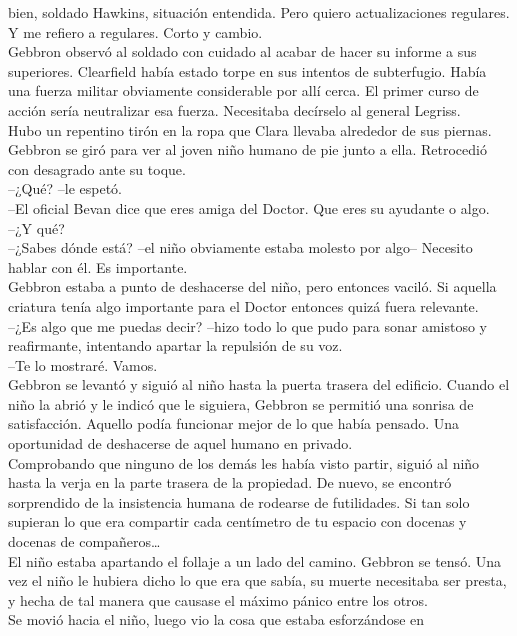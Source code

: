 bien, soldado Hawkins, situación entendida. Pero quiero actualizaciones
regulares. Y me refiero a regulares. Corto y cambio.\\
Gebbron observó al soldado con cuidado al acabar de hacer su informe a
sus superiores. Clearfield había estado torpe en sus intentos de
subterfugio. Había una fuerza militar obviamente considerable por allí
cerca. El primer curso de acción sería neutralizar esa fuerza.
Necesitaba decírselo al general Legriss.\\
Hubo un repentino tirón en la ropa que Clara llevaba alrededor de sus
piernas. Gebbron se giró para ver al joven niño humano de pie junto a
ella. Retrocedió con desagrado ante su toque.\\
--¿Qué? --le espetó.\\
--El oficial Bevan dice que eres amiga del Doctor. Que eres su ayudante
o algo.\\
--¿Y qué?\\
--¿Sabes dónde está? --el niño obviamente estaba molesto por algo--
Necesito hablar con él. Es importante.\\
Gebbron estaba a punto de deshacerse del niño, pero entonces vaciló. Si
aquella criatura tenía algo importante para el Doctor entonces quizá
fuera relevante.\\
--¿Es algo que me puedas decir? --hizo todo lo que pudo para sonar
amistoso y reafirmante, intentando apartar la repulsión de su voz.\\
--Te lo mostraré. Vamos.\\
Gebbron se levantó y siguió al niño hasta la puerta trasera del
edificio. Cuando el niño la abrió y le indicó que le siguiera, Gebbron
se permitió una sonrisa de satisfacción. Aquello podía funcionar mejor
de lo que había pensado. Una oportunidad de deshacerse de aquel humano
en privado.\\
Comprobando que ninguno de los demás les había visto partir, siguió al
niño hasta la verja en la parte trasera de la propiedad. De nuevo, se
encontró sorprendido de la insistencia humana de rodearse de
futilidades. Si tan solo supieran lo que era compartir cada centímetro
de tu espacio con docenas y docenas de compañeros\ldots{}\\
El niño estaba apartando el follaje a un lado del camino. Gebbron se
tensó. Una vez el niño le hubiera dicho lo que era que sabía, su muerte
necesitaba ser presta, y hecha de tal manera que causase el máximo
pánico entre los otros.\\
Se movió hacia el niño, luego vio la cosa que estaba esforzándose en
